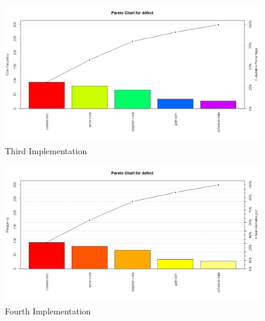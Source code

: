 \documentclass[SPC-MASTER.tex]{subfiles}
\begin{document}
\begin{figure}[h!]
\centering
\includegraphics[width=0.9\linewidth]{images/Pareto3}
\caption{Third Implementation}
\label{fig:Pareto3}
\end{figure}

\begin{figure}[h!]
\centering
\includegraphics[width=0.9\linewidth]{images/Pareto5}
\caption{Fourth Implementation}
\label{fig:Pareto5}
\end{figure}
\end{document}
